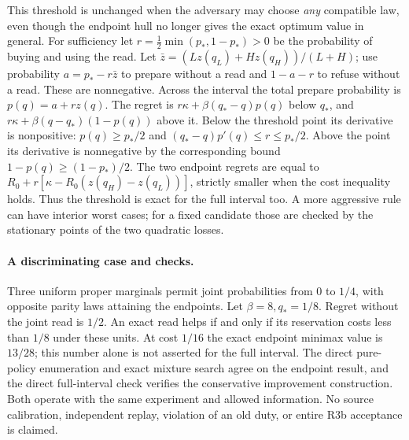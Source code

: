 \documentclass[11pt]{article}
\begin{document}
This threshold is unchanged when the adversary may choose \emph{any} compatible law, even though the endpoint hull no longer gives the exact optimum value in general. For sufficiency let \(r=\tfrac12\min(p_*,1-p_*)>0\) be the probability of buying and using the read. Let \(\bar z=(Lz(q_L)+Hz(q_H))/(L+H)\); use probability \(a=p_*-r\bar z\) to prepare without a read and \(1-a-r\) to refuse without a read. These are nonnegative. Across the interval the total prepare probability is \(p(q)=a+rz(q)\). The regret is \(r\kappa+\beta(q_*-q)p(q)\) below \(q_*\), and \(r\kappa+\beta(q-q_*)(1-p(q))\) above it. Below the threshold point its derivative is nonpositive: \(p(q)\geq p_*/2\) and \((q_*-q)p'(q)\leq r\leq p_*/2\). Above the point its derivative is nonnegative by the corresponding bound \(1-p(q)\geq(1-p_*)/2\). The two endpoint regrets are equal to \(R_0+r[\kappa-R_0(z(q_H)-z(q_L))]\), strictly smaller when the cost inequality holds. Thus the threshold is exact for the full interval too. A more aggressive rule can have interior worst cases; for a fixed candidate those are checked by the stationary points of the two quadratic losses.
\paragraph{A discriminating case and checks.}
Three uniform proper marginals permit joint probabilities from 0 to \(1/4\), with opposite parity laws attaining the endpoints. Let \(\beta=8,q_*=1/8\). Regret without the joint read is \(1/2\). An exact read helps if and only if its reservation costs less than \(1/8\) under these units. At cost \(1/16\) the exact endpoint minimax value is \(13/28\); this number alone is not asserted for the full interval. The direct pure-policy enumeration and exact mixture search agree on the endpoint result, and the direct full-interval check verifies the conservative improvement construction. Both operate with the same experiment and allowed information. No source calibration, independent replay, violation of an old duty, or entire R3b acceptance is claimed.
\end{document}
